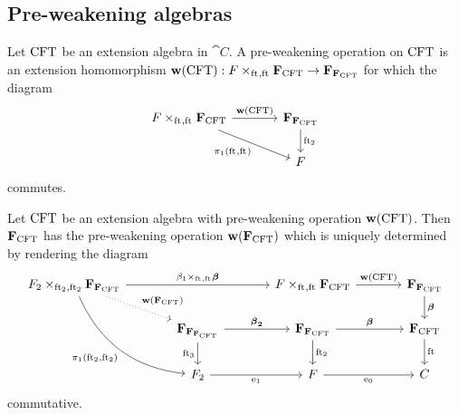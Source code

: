 \subsection{Pre-weakening algebras}
\begin{defn}
Let $\mathrm{CFT}$ be an extension algebra in $\cat{C}$. A pre-weakening operation
on $\mathrm{CFT}$ is an extension homomorphism 
$ \mathbf{w}(\stesys)
    :
  \cobesys{\stesysf}{\famesys{\stesys}}{\eft}{\eft}
    \to
  \famesys{\famesys{\stesys}}$
for which the diagram
\begin{equation*}
\begin{tikzcd}[column sep=large]
\cobesys{\stesysf}{\famesys{\stesys}}{\eft}{\eft}
  \ar{r}{\mathbf{w}(\stesys)}
  \ar{dr}[swap]{\pullbackpr{1}{\eft}{\eft}}
  &
\famesys{\famesys{\stesys}}
  \ar{d}{\eft[2]}
  \\
& \stesysf
\end{tikzcd}
\end{equation*}
commutes.
\end{defn}

\begin{defn}
Let $\mathrm{CFT}$ be an extension algebra with pre-weakening operation
$\mathbf{w}(\mathrm{CFT})$. Then $\mathbf{F}_{\mathrm{CFT}}$ has the pre-weakening operation
$\mathbf{w}(\mathbf{F}_{\mathrm{CFT}})$ which is uniquely determined by rendering the
diagram
\begin{equation*}
\begin{tikzcd}[column sep=large]
\cobesys{\stesysf_2}{\famesys{\famesys{\stesys}}}{\eft[2]}{\eft[2]}
  \ar{rr}{%
      \pullback{\beta_1}{\boldsymbol{\beta}}{\eft}{\eft}
    }
  \ar[bend right]{ddr}[swap]{\pullbackpr{1}{\eft[2]}{\eft[2]}}
  \ar[dotted]{dr}{\mathbf{w}(\famesys{\stesys})}
  &
  {}&
\cobesys{\stesysf}{\famesys{\stesys}}{\eft}{\eft}
  \ar{r}{\mathbf{w}(\stesys)}
  &
\famesys{\famesys{\stesys}}
  \ar{d}{\boldsymbol{\beta}}
  \\
  {}&
\famesys{\famesys{\famesys{\stesys}}}
  \ar{r}{\boldsymbol{\beta}_\mathbf{2}}
  \ar{d}[swap]{\eft[3]}
  &
\famesys{\famesys{\stesys}}
  \ar{d}{\eft[2]}
  \ar{r}{\boldsymbol{\beta}}
  &
\famesys{\stesys}
  \ar{d}{\eft}
  \\
  {}&
\stesysf_2
  \ar{r}[swap]{\efamext}
  &
\stesysf
  \ar{r}[swap]{\ectxext}
  &
\stesysc
\end{tikzcd}
\end{equation*}
commutative.
\end{defn}

